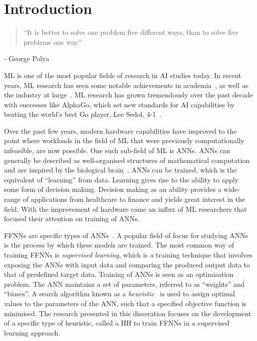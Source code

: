 \chapter{Introduction}\label{chap:introduction}

\begin{quotation}
      ``It is better to solve one problem five different ways, than to solve five problems one way.''
\end{quotation}
\begin{flushright}
      - George Polya
\end{flushright}

\Acf{ML} is one of the most popular fields of research in \acf{AI} studies today. In recent years, \acs{ML} research has seen some notable achievements in academia~\cite{ref:lecun:2015, ref:glorot:2010, ref:goodfellow:2014, ref:quoc:2017}, as well as the industry at large~\cite{ref:silver:2016, ref:silver:2017, ref:zoph:2017, ref:lewis:2017}.  \acs{ML} research has grown tremendously over the past decade with successes like AlphaGo, which set new standards for \acs{AI} capabilities by beating the world's best Go player, Lee Sedol, 4-1~\cite{ref:san-hun:2016}.

Over the past few years, modern hardware capabilities have improved to the point where workloads in the field of \acs{ML} that were previously computationally infeasible, are now possible. One such sub-field of \acs{ML} is \acp{ANN}. \acp{ANN} can generally be described as well-organised structures of mathematical computation and are inspired by the biological brain~\cite{ref:engelbrecht:2007}. \acp{ANN} can be trained, which is the equivalent of ``learning'' from data. Learning gives rise to the ability to apply some form of decision making. Decision making as an ability provides a wide-range of applications from healthcare to finance and yields great interest in the field. With the improvement of hardware came an influx of \acs{ML} researchers that focused their attention on training of \acp{ANN}.

\Acfp{FFNN} are specific types of \acp{ANN}~\cite{ref:reed:1999}. A popular field of focus for studying \acp{ANN} is the process by which these models are trained.  The most common way of training \acp{FFNN} is \textit{supervised learning}, which is a training technique that involves exposing the \acp{ANN} with input data and comparing the produced output data to that of predefined target data. Training of \acp{ANN} is seen as an optimisation problem. The \acs{ANN} maintains a set of parameters, referred to as ``weights'' and ``biases''. A search algorithm known as a \textit{heuristic}~\cite{ref:pearl:1984} is used to assign optimal values to the parameters of the \acs{ANN}, such that a specified objective function is minimised. The research presented in this disseration focuses on the development of a specific type of heuristic, called a \acf{HH} to train \acp{FFNN} in a supervised learning approach.

